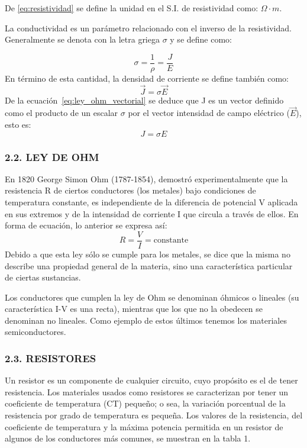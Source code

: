 \documentclass[12pt, a4paper]{article}
\begin{document}
De \eqref{eq:resistividad} se define la unidad en el S.I. de resistividad como: $\Omega \cdot m$.

La conductividad es un parámetro relacionado con el inverso de la resistividad. Generalmente se denota con la letra griega 
$\sigma$ y se define como:

\begin{equation}
    \sigma = \frac{1}{\rho} = \frac{J}{E}
    \label{eq:conductividad}
\end{equation}
En término de esta cantidad, la densidad de corriente se define también como:
\begin{equation}
    \vec{J} = \sigma \vec{E}
    \label{eq:ley_ohm_vectorial}
\end{equation}
De la ecuación~\eqref{eq:ley_ohm_vectorial} se deduce que J es un vector definido como el producto de un escalar $\sigma$ 
por el vector intensidad de campo eléctrico ($\vec{E}$), esto es:
\begin{equation}
    J = \sigma E
\end{equation}

\subsubsection*{2.2. LEY DE OHM}
En 1820 George Simon Ohm (1787-1854), demostró experimentalmente que la resistencia R de ciertos conductores (los metales) 
bajo condiciones de temperatura constante, es independiente de la diferencia de potencial V aplicada en sus extremos y de 
la intensidad de corriente I que circula a través de ellos. En forma de ecuación, lo anterior se expresa así:
\begin{equation}
    R = \frac{V}{I} = \text{constante}
\end{equation}
Debido a que esta ley sólo se cumple para los metales, se dice que la misma no describe una propiedad general de la materia, 
sino una característica particular de ciertas sustancias.

Los conductores que cumplen la ley de Ohm se denominan óhmicos o lineales (su característica I-V es una recta), mientras que 
los que no la obedecen se denominan no lineales. Como ejemplo de estos últimos tenemos los materiales semiconductores.

\subsubsection*{2.3. RESISTORES}
Un resistor es un componente de cualquier circuito, cuyo propósito es el de tener resistencia. Los materiales usados como 
resistores se caracterizan por tener un coeficiente de temperatura (CT) pequeño; o sea, la variación porcentual de la 
resistencia por grado de temperatura es pequeña. Los valores de la resistencia, del coeficiente de temperatura y la máxima 
potencia permitida en un resistor de algunos de los conductores más comunes, se muestran en la tabla 1.
\end{document}
